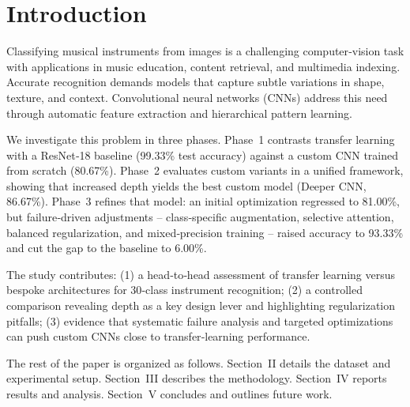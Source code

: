 
\section{Introduction}
\noindent
Classifying musical instruments from images is a challenging computer‑vision task with applications in music education, content retrieval, and multimedia indexing. Accurate recognition demands models that capture subtle variations in shape, texture, and context. Convolutional neural networks (CNNs) \cite{krizhevsky2012imagenet, simonyan2014very} address this need through automatic feature extraction and hierarchical pattern learning.

\noindent
We investigate this problem in three phases. Phase~1 contrasts transfer learning with a ResNet‑18 baseline (99.33\% test accuracy) against a custom CNN trained from scratch (80.67\%). Phase~2 evaluates custom variants in a unified framework, showing that increased depth yields the best custom model (Deeper CNN, 86.67\%). Phase~3 refines that model: an initial optimization regressed to 81.00\%, but failure‑driven adjustments – class‑specific augmentation, selective attention, balanced regularization, and mixed‑precision training – raised accuracy to 93.33\% and cut the gap to the baseline to 6.00\%.

\noindent
The study contributes:  
(1) a head‑to‑head assessment of transfer learning versus bespoke architectures for 30‑class instrument recognition;  
(2) a controlled comparison revealing depth as a key design lever and highlighting regularization pitfalls;  
(3) evidence that systematic failure analysis and targeted optimizations can push custom CNNs close to transfer‑learning performance.

\noindent
The rest of the paper is organized as follows. Section~II details the dataset and experimental setup. Section~III describes the methodology. Section~IV reports results and analysis. Section~V concludes and outlines future work.
